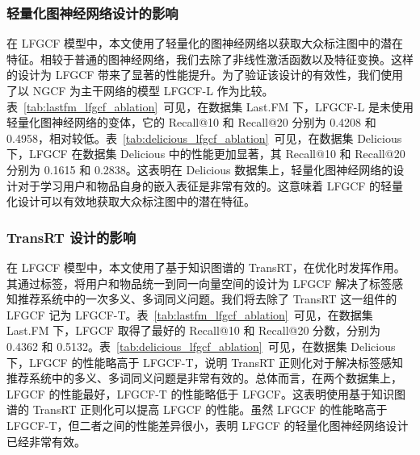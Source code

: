 \subsubsection{轻量化图神经网络设计的影响}
在 LFGCF 模型中，本文使用了轻量化的图神经网络以获取大众标注图中的潜在特征。相较于普通的图神经网络，我们去除了非线性激活函数以及特征变换。这样的设计为 LFGCF 带来了显著的性能提升。为了验证该设计的有效性，我们使用了以 NGCF 为主干网络的模型 LFGCF-L 作为比较。表~\ref{tab:lastfm_lfgcf_ablation}~可见，在数据集 Last.FM 下，LFGCF-L 是未使用轻量化图神经网络的变体，它的 Recall@10 和 Recall@20 分别为 0.4208 和 0.4958，相对较低。表~\ref{tab:delicious_lfgcf_ablation}~可见，在数据集 Delicious 下，LFGCF 在数据集 Delicious 中的性能更加显著，其 Recall@10 和 Recall@20 分别为 0.1615 和 0.2838。这表明在 Delicious 数据集上，轻量化图神经网络的设计对于学习用户和物品自身的嵌入表征是非常有效的。这意味着 LFGCF 的轻量化设计可以有效地获取大众标注图中的潜在特征。
\subsubsection{TransRT 设计的影响}
在 LFGCF 模型中，本文使用了基于知识图谱的 TransRT，在优化时发挥作用。其通过标签，将用户和物品统一到同一向量空间的设计为 LFGCF 解决了标签感知推荐系统中的一次多义、多词同义问题。我们将去除了 TransRT 这一组件的 LFGCF 记为 LFGCF-T。表~\ref{tab:lastfm_lfgcf_ablation}~可见，在数据集 Last.FM 下，LFGCF 取得了最好的 Recall@10 和 Recall@20 分数，分别为 0.4362 和 0.5132。表~\ref{tab:delicious_lfgcf_ablation}~可见，在数据集 Delicious 下，LFGCF 的性能略高于 LFGCF-T，说明 TransRT 正则化对于解决标签感知推荐系统中的多义、多词同义问题是非常有效的。总体而言，在两个数据集上，LFGCF 的性能最好，LFGCF-T 的性能略低于 LFGCF。这表明使用基于知识图谱的 TransRT 正则化可以提高 LFGCF 的性能。虽然 LFGCF 的性能略高于 LFGCF-T，但二者之间的性能差异很小，表明 LFGCF 的轻量化图神经网络设计已经非常有效。

